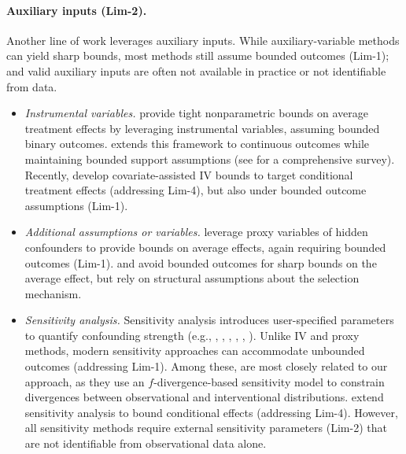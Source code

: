 \paragraph{Auxiliary inputs (Lim-2).} Another line of work leverages auxiliary inputs. While auxiliary-variable methods can yield sharp bounds, most methods still assume bounded outcomes (Lim-1); and valid auxiliary inputs are often not available in practice or not identifiable from data. 
\begin{itemize}[leftmargin=*, topsep=0pt, itemsep=0pt]
    \item \textit{Instrumental variables.} \citet{balke1997bounds} provide tight nonparametric bounds on average treatment effects by leveraging instrumental variables, assuming bounded binary outcomes. \citet{kitagawa2021IV} extends this framework to continuous outcomes while maintaining bounded support assumptions (see \citet{swanson2018partial} for a comprehensive survey). Recently, \citet{levis2025covariate} develop covariate-assisted IV bounds to target conditional treatment effects (addressing Lim-4), but also under bounded outcome assumptions (Lim-1). 
    \item \textit{Additional assumptions or variables.} \citet{ghassami2023partial} leverage proxy variables of hidden confounders to provide bounds on average effects, again requiring bounded outcomes (Lim-1). \citet{lee2009training} and \citet{semenova2025generalized} avoid bounded outcomes for sharp bounds on the average effect, but rely on structural assumptions about the selection mechanism.
    \item \textit{Sensitivity analysis.} Sensitivity analysis introduces user-specified parameters to quantify confounding strength (e.g., \citet{rosenbaum1987sensitivity}, \citet{tan2006distributional}, \citet{yadlowsky2022bounds}, \citet{jin2022sensitivity}, \citet{dorn2023sharp}, \citet{oprescu2023b}). Unlike IV and proxy methods, modern sensitivity approaches can accommodate unbounded outcomes (addressing Lim-1). Among these, \citet{jin2022sensitivity} are most closely related to our approach, as they use an $f$-divergence-based sensitivity model to constrain divergences between observational and interventional distributions. \citet{oprescu2023b} extend sensitivity analysis to bound conditional effects (addressing Lim-4). However, all sensitivity methods require external sensitivity parameters (Lim-2) that are not identifiable from observational data alone.
\end{itemize}


